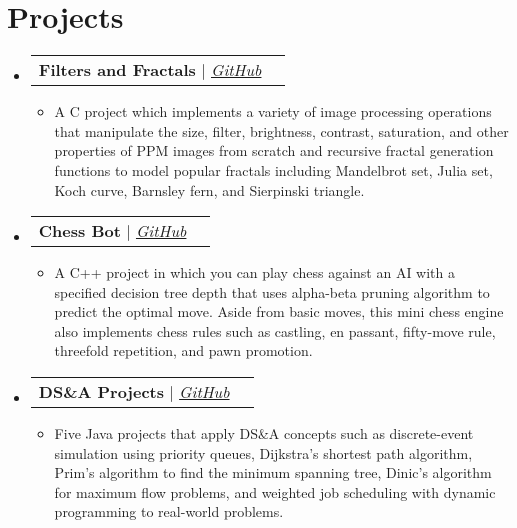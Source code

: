 \documentclass[letterpaper,11pt]{article}
\makeatletter
\newcommand{\resumeItem}[1]{
  \item\small{
    {#1 \vspace{-2pt}}
  }
}
\newcommand{\resumeProjectHeading}[2]{
    \vspace{-2pt}\item
    \begin{tabular*}{0.97\textwidth}{l@{\extracolsep{\fill}}r}
      \small#1 & #2 \\
    \end{tabular*}\vspace{-7pt}
}
\newcommand{\resumeSubHeadingListStart}{\begin{itemize}[leftmargin=0.15in, label={}]}
\newcommand{\resumeSubHeadingListEnd}{\end{itemize}}
\newcommand{\resumeItemListStart}{\begin{itemize}}
\newcommand{\resumeItemListEnd}{\end{itemize}\vspace{-5pt}}
\makeatother
\begin{document}
{{{{{%

\section{Projects}
    \vspace{3pt}
    \resumeSubHeadingListStart
      
      \resumeProjectHeading
        {\textbf{Filters and Fractals} $|$ \emph{\href{https://github.com/arasgungore/filters-and-fractals}{\color{blue}GitHub}}}{}
          \resumeItemListStart
            \resumeItem{A C project which implements a variety of image processing operations that manipulate the size, filter, brightness, contrast, saturation, and other properties of PPM images from scratch and recursive fractal generation functions to model popular fractals including Mandelbrot set, Julia set, Koch curve, Barnsley fern, and Sierpinski triangle.}
          \resumeItemListEnd
      
      \resumeProjectHeading
        {\textbf{Chess Bot} $|$ \emph{\href{https://github.com/arasgungore/chess-bot}{\color{blue}GitHub}}}{}
          \resumeItemListStart
            \resumeItem{A C++ project in which you can play chess against an AI with a specified decision tree depth that uses alpha-beta pruning algorithm to predict the optimal move. Aside from basic moves, this mini chess engine also implements chess rules such as castling, en passant, fifty-move rule, threefold repetition, and pawn promotion.}
          \resumeItemListEnd
      
      \resumeProjectHeading
        {\textbf{DS\&A Projects} $|$ \emph{\href{https://github.com/arasgungore/CMPE250-projects}{\color{blue}GitHub}}}{}
          \resumeItemListStart
            \resumeItem{Five Java projects that apply DS\&A concepts such as discrete-event simulation using priority queues, Dijkstra's shortest path algorithm, Prim's algorithm to find the minimum spanning tree, Dinic's algorithm for maximum flow problems, and weighted job scheduling with dynamic programming to real-world problems.}
          \resumeItemListEnd
      
    \resumeSubHeadingListEnd







    
}}}}}
\end{document}
